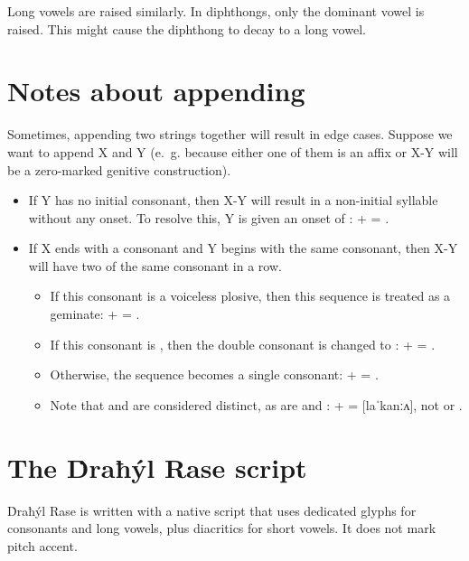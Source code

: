 \documentclass{book}
\begin{document}
Long vowels are raised similarly. In diphthongs, only the dominant vowel is raised. This might cause the diphthong to decay to a long vowel.

\section{Notes about appending}
\label{sec:append}

Sometimes, appending two strings together will result in edge cases. Suppose we want to append X and Y (e.~g. because either one of them is an affix or X-Y will be a zero-marked genitive construction).

\begin{itemize}
    \item If Y has no initial consonant, then X-Y will result in a non-initial syllable without any onset. To resolve this, Y is given an onset of :  +  = .
    \item If X ends with a consonant and Y begins with the same consonant, then X-Y will have two of the same consonant in a row.
    \begin{itemize}
        \item If this consonant is a voiceless plosive, then this sequence is treated as a geminate:  +  = .
        \item If this consonant is , then the double consonant is changed to :  +  = .
        \item Otherwise, the sequence becomes a single consonant:  +  = .
        \item Note that  and  are considered distinct, as are  and :  +  =  [laˈkanːʌ], not  or .
    \end{itemize}
\end{itemize}

\section{The Ḋraħýl Rase script}

Ḋraħýl Rase is written with a native script that uses dedicated glyphs for consonants and long vowels, plus diacritics for short vowels. It does not mark pitch accent.
\end{document}
